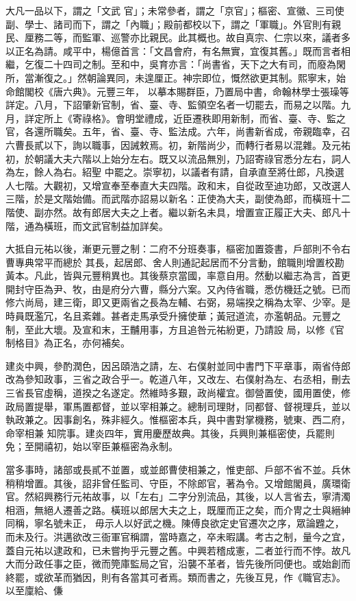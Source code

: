 \begin{pinyinscope}
 大凡一品以下，謂之「文武
 官」；未常參者，謂之「京官」；樞密、宣徽、三司使副、學士、諸司而下，謂之「內職」；殿前都校以下，謂之「軍職」。外官則有親民、厘務二等，而監軍、巡警亦比親民。此其概也。故自真宗、仁宗以來，議者多以正名為請。咸平中，楊億首言：「文昌會府，有名無實，宜復其舊。」既而言者相繼，乞復二十四司之制。至和中，吳育亦言：「尚書省，天下之大有司，而廢為閑所，當漸復之。」然朝論異同，未遑厘正。神宗即位，慨然欲更其制。熙寧末，始命館閣校《唐六典》。元豐三年，
 以摹本賜群臣，乃置局中書，命翰林學士張璪等詳定。八月，下詔肇新官制，省、臺、寺、監領空名者一切罷去，而易之以階。九月，詳定所上《寄祿格》。會明堂禮成，近臣遷秩即用新制，而省、臺、寺、監之官，各還所職矣。五年，省、臺、寺、監法成。六年，尚書新省成，帝親臨幸，召六曹長貳以下，詢以職事，因誡敕焉。初，新階尚少，而轉行者易以混雜。及元祐初，於朝議大夫六階以上始分左右。既又以流品無別，乃詔寄祿官悉分左右，詞人為左，餘人為右。紹聖
 中罷之。崇寧初，以議者有請，自承直至將仕郎，凡換選人七階。大觀初，又增宣奉至奉直大夫四階。政和末，自從政至迪功郎，又改選人三階，於是文階始備。而武階亦詔易以新名：正使為大夫，副使為郎，而橫班十二階使、副亦然。故有郎居大夫之上者。繼以新名未具，增置宣正履正大夫、郎凡十階，通為橫班，而文武官制益加詳矣。



 大抵自元祐以後，漸更元豐之制：二府不分班奏事，樞密加置簽書，戶部則不令右曹專典常平而總於
 其長，起居郎、舍人則通記起居而不分言動，館職則增置校勘黃本。凡此，皆與元豐稍異也。其後蔡京當國，率意自用。然動以繼志為言，首更開封守臣為尹、牧，由是府分六曹，縣分六案。又內侍省職，悉仿機廷之號。已而修六尚局，建三衛，即又更兩省之長為左輔、右弼，易端揆之稱為太宰、少宰。是時員既濫冗，名且紊雜。甚者走馬承受升擁使華；黃冠道流，亦濫朝品。元豐之制，至此大壞。及宣和末，王黼用事，方且追咎元祐紛更，乃請設
 局，以修《官制格目》為正名，亦何補矣。



 建炎中興，參酌潤色，因呂頤浩之請，左、右僕射並同中書門下平章事，兩省侍郎改為參知政事，三省之政合乎一。乾道八年，又改左、右僕射為左、右丞相，刪去三省長官虛稱，道揆之名遂定。然維時多艱，政尚權宜。御營置使，國用置使，修政局置提舉，軍馬置都督，並以宰相兼之。總制司理財，同都督、督視理兵，並以執政兼之。因事創名，殊非經久。惟樞密本兵，與中書對掌機務，號東、西二府，命宰相兼
 知院事。建炎四年，實用慶歷故典。其後，兵興則兼樞密使，兵罷則免；至開禧初，始以宰臣兼樞密為永制。



 當多事時，諸部或長貳不並置，或並郎曹使相兼之，惟吏部、戶部不省不並。兵休稍稍增置。其後，詔非曾任監司、守臣，不除郎官，著為令。又增館閣員，廣環衛官。然紹興務行元祐故事，以「左右」二字分別流品，其後，以人言省去，寧清濁相涵，無絕人遷善之路。橫班以郎居大夫之上，既厘而正之矣，而介冑之士與縉紳同稱，寧名號未正，
 毋示人以好武之機。陳傅良欲定史官遷次之序，眾論韙之，而未及行。洪邁欲改三衙軍官稱謂，當時嘉之，卒未暇講。考古之制，量今之宜，蓋自元祐以逮政和，已未嘗拘乎元豐之舊。中興若稽成憲，二者並行而不悖。故凡大而分政任事之臣，微而筦庫監局之官，沿襲不革者，皆先後所同便也。或始創而終罷，或欲革而猶因，則有各當其可者焉。類而書之，先後互見，作《職官志》。以至廩給、傔




\end{pinyinscope}
